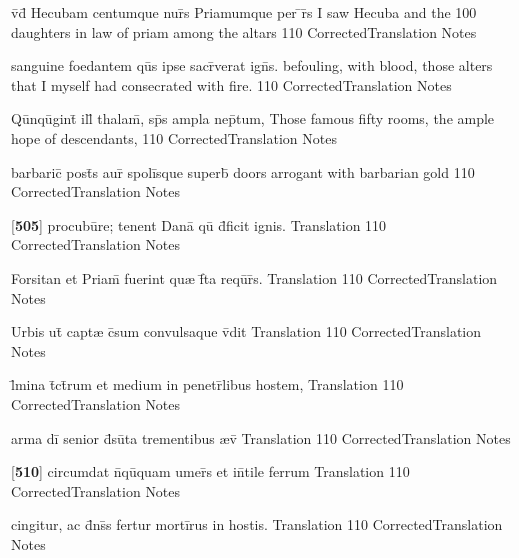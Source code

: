 \latline
  {v\={\macron {\i}}d\={\macron {\i}} Hecubam centumque nur\={}s Priamumque per \={}r\={}s}
  { I saw Hecuba and the 100 daughters in law of priam among the altars }
  {110}
  { CorrectedTranslation }
  { Notes }


\latline
  {sanguine foedantem qu\={}s ipse sacr\={}verat ign\={\macron {\i}}s.}
  { befouling, with blood,  those alters that I myself had consecrated with fire.  }
  {110}
  { CorrectedTranslation }
  { Notes }


\latline
  {Qu\={\macron {\i}}nqu\={}gint\={} ill\={\macron {\i}} thalam\={\macron {\i}}, sp\={}s ampla nep\={}tum,}
  { Those famous fifty rooms, the ample hope of descendants, }
  {110}
  { CorrectedTranslation }
  { Notes }


\latline
  {barbaric\={} post\={}s aur\={} spoli\={\macron {\i}}sque superb\={\macron {\i}}}
  { doors arrogant with barbarian gold  }
  {110}
  { CorrectedTranslation }
  { Notes }


\latline
  {[\textbf{505}] procubu\={}re; tenent Dana\={\macron {\i}} qu\={} d\={}ficit ignis.}
  { Translation }
  {110}
  { CorrectedTranslation }
  { Notes }


\latline
  {Forsitan et Priam\={\macron {\i}} fuerint qu{\ae} f\={}ta requ\={\macron {\i}}r\={}s.}
  { Translation }
  {110}
  { CorrectedTranslation }
  { Notes }


\latline
  {Urbis ut\={\macron {\i}} capt{\ae} c\={}sum convulsaque v\={\macron {\i}}dit}
  { Translation }
  {110}
  { CorrectedTranslation }
  { Notes }


\latline
  {l\={\macron {\i}}mina t\={}ct\={}rum et medium in penetr\={}libus hostem,}
  { Translation }
  {110}
  { CorrectedTranslation }
  { Notes }


\latline
  {arma di\={} senior d\={}su\={}ta trementibus {\ae}v\={}}
  { Translation }
  {110}
  { CorrectedTranslation }
  { Notes }


\latline
  {[\textbf{510}] circumdat n\={}qu\={\macron {\i}}quam umer\={\macron {\i}}s et in\={}tile ferrum}
  { Translation }
  {110}
  { CorrectedTranslation }
  { Notes }


\latline
  {cingitur, ac d\={}ns\={}s fertur morti\={}rus in hostis.}
  { Translation }
  {110}
  { CorrectedTranslation }
  { Notes }


